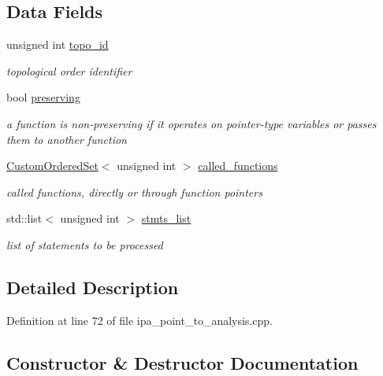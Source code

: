 \subsection*{Data Fields}
\begin{DoxyCompactItemize}
\item 
unsigned int \hyperlink{structfunction__information_a074b9818c571f70fa658e881ac929365}{topo\+\_\+id}
\begin{DoxyCompactList}\small\item\em topological order identifier \end{DoxyCompactList}\item 
bool \hyperlink{structfunction__information_ae2e7d471c2418e2c5113cb574174c828}{preserving}
\begin{DoxyCompactList}\small\item\em a function is non-\/preserving if it operates on pointer-\/type variables or passes them to another function \end{DoxyCompactList}\item 
\hyperlink{classCustomOrderedSet}{Custom\+Ordered\+Set}$<$ unsigned int $>$ \hyperlink{structfunction__information_a15bcc023670df2a2b924bb7c14c10855}{called\+\_\+functions}
\begin{DoxyCompactList}\small\item\em called functions, directly or through function pointers \end{DoxyCompactList}\item 
std\+::list$<$ unsigned int $>$ \hyperlink{structfunction__information_a4154e6d65260c36203f42f3181c3f743}{stmts\+\_\+list}
\begin{DoxyCompactList}\small\item\em list of statements to be processed \end{DoxyCompactList}\end{DoxyCompactItemize}


\subsection{Detailed Description}


Definition at line 72 of file ipa\+\_\+point\+\_\+to\+\_\+analysis.\+cpp.



\subsection{Constructor \& Destructor Documentation}
\mbox{\label{structfunction__information_a625bf421e2ff53787babc999452ce8af}} 
